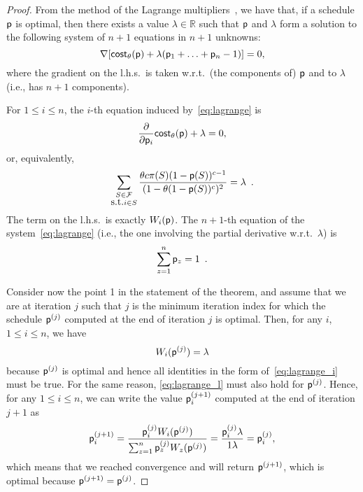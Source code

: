 \begin{proof}
	From the method of the Lagrange multipliers~\citep[Sect.~5.1]{BoydV04}, we
	have that, if a schedule $\mathsf{p}$ is optimal, then there exists a value
	$\lambda\in\mathbb{R}$ such that $\mathsf{p}$ and $\lambda$ form a solution to
	the following system of $n+1$ equations in $n+1$ unknowns:
	\begin{equation}\label{eq:lagrange}
		\nabla [\mathsf{cost}_\theta(\mathsf{p}) + \lambda (\mathsf{p}_1+\ldots+\mathsf{p}_n-1)] = 0,
	\end{equation}
	where the gradient on the l.h.s.~is taken w.r.t.~(the components of)
	$\mathsf{p}$ and to $\lambda$ (i.e., has $n+1$ components).

	For $1\le i\le n$, the $i$-th equation induced by~\eqref{eq:lagrange} is
	\[
		\frac{\partial}{\partial \mathsf{p}_i} \mathsf{cost}_\theta(\mathsf{p}) + \lambda = 0,
	\]
	or, equivalently,
	\begin{equation}\label{eq:lagrange_i}
		\sum_{\substack{S\in\mathcal{F}\\\mbox{s.t.} i\in S}} \frac{\theta c
			\pi(S) (1-\mathsf{p}(S))^{c-1}}{(1-\theta(1-\mathsf{p}(S))^c)^2} =
			\lambda\enspace.
	\end{equation}
	The term on the l.h.s.~is exactly $W_i(\mathsf{p})$.
	The $n+1$-th equation of the system~\eqref{eq:lagrange} (i.e., the one
	involving the partial derivative w.r.t.~$\lambda$) is
	\begin{equation}\label{eq:lagrange_l}
		\sum_{z=1}^n \mathsf{p}_z = 1\enspace.
	\end{equation}

	Consider now the point 1 in the statement of the theorem, and assume that we
	are at iteration $j$ such that $j$ is the minimum iteration index for which
	the schedule $\mathsf{p}^{(j)}$ computed at the end of iteration $j$ is optimal.
	Then, for any $i$, $1\le i\le n$, we have
	\[
		W_i(\mathsf{p}^{(j)})=\lambda
	\]
	because $\mathsf{p}^{(j)}$ is optimal and hence all identities in the form
	of~\eqref{eq:lagrange_i} must be true. For the same reason,
	\eqref{eq:lagrange_l} must also hold for $\mathsf{p}^{(j)}$.
	Hence, for any $1\le i\le n$, we can write the value $\mathsf{p}^{(j+1)}_i$
	computed at the end of iteration $j+1$ as
	\[
		\mathsf{p}^{(j+1)}_i = \frac{\mathsf{p}^{(j)}_i W_i(\mathsf{p}^{(j)})}{\sum_{z=1}^n
		\mathsf{p}^{(j)}_z W_z(\mathsf{p}^{(j)})}=
		\frac{\mathsf{p}^{(j)}_i\lambda}{1\lambda}=\mathsf{p}^{(j)}_i,
	\]
	which means that we reached convergence and \algoname will return
	$\mathsf{p}^{(j+1)}$, which is optimal because $\mathsf{p}^{(j+1)}=\mathsf{p}^{(j)}$.


\end{proof}
